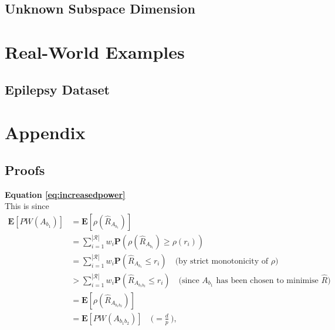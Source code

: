 \documentclass[12pt]{article}
\begin{document}


\subsection{Unknown Subspace Dimension}


\section{Real-World Examples}


\subsection{Epilepsy Dataset}


\section*{Appendix}
\subsection*{Proofs}
\noindent \textbf{Equation \ref{eq:increasedpower}} \\
This is since
\begin{align*}
    \mathbf{E}[PW(A_{b_1})]  & = \mathbf{E}[\rho(\hat{R}_{A_{b_1}})] \\
    & = \sum_{i = 1}^{|\mathcal{R}|} w_i \mathbf{P}(\rho(\hat{R}_{A_{b_1}}) \geq \rho(r_i)) \\
    & = \sum_{i = 1}^{|\mathcal{R}|} w_i \mathbf{P}(\hat{R}_{A_{b_1}} \leq r_i) \quad \text{(by strict monotonicity of $\rho$)}\\
    & > \sum_{i = 1}^{|\mathcal{R}|} w_i \mathbf{P}(\hat{R}_{A_{b_1b_2}} \leq r_i)  \quad \text{(since $A_{b_1}$ has been chosen to minimise $\hat{R}$)} \\
    & = \mathbf{E}[\rho(\hat{R}_{A_{b_1b_2}})] \\
    & = \mathbf{E}[PW(A_{b_1b_2})] \quad \big(= \frac{d}{p} \ \big),
\end{align*}
\end{document}
